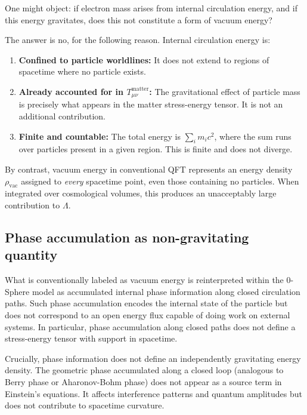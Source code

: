 \documentclass[12pt,letterpaper]{article}
\begin{document}
One might object: if electron mass arises from internal circulation energy, and if this energy gravitates, does this not constitute a form of vacuum energy?

The answer is no, for the following reason. Internal circulation energy is:

\begin{enumerate}
\item \textbf{Confined to particle worldlines:} It does not extend to regions of spacetime where no particle exists.

\item \textbf{Already accounted for in $T_{\mu\nu}^{\mathrm{matter}}$:} The gravitational effect of particle mass is precisely what appears in the matter stress-energy tensor. It is not an additional contribution.

\item \textbf{Finite and countable:} The total energy is $\sum_i m_i c^2$, where the sum runs over particles present in a given region. This is finite and does not diverge.
\end{enumerate}

By contrast, vacuum energy in conventional QFT represents an energy density $\rho_{\mathrm{vac}}$ assigned to \emph{every} spacetime point, even those containing no particles. When integrated over cosmological volumes, this produces an unacceptably large contribution to $\Lambda$.

\subsection{Phase accumulation as non-gravitating quantity}

What is conventionally labeled as vacuum energy is reinterpreted within the 0-Sphere model as accumulated internal phase information along closed circulation paths. Such phase accumulation encodes the internal state of the particle but does not correspond to an open energy flux capable of doing work on external systems. In particular, phase accumulation along closed paths does not define a stress-energy tensor with support in spacetime.

Crucially, phase information does not define an independently gravitating energy density. The geometric phase accumulated along a closed loop (analogous to Berry phase or Aharonov-Bohm phase) does not appear as a source term in Einstein's equations. It affects interference patterns and quantum amplitudes but does not contribute to spacetime curvature.
\end{document}

